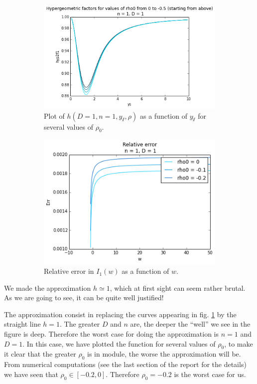 \begin{figure}[htp]
\centering
\begin{subfigure}{.5\textwidth}
	\centering
	\includegraphics[width=.9\linewidth]{img/approx/hyp2f1.png}
	\caption{Plot of $h(D=1,n=1,y_\sslash,\rho)$ as a function of $y_\sslash$ for several values of $\rho_0$.}
	\label{fig:h}
	\end{subfigure}%
\begin{subfigure}{.5\textwidth}
	\centering
	\includegraphics[width=.9\linewidth]{img/approx/relat_err.png}
	\caption{Relative error in $I_1(w)$ as a function of $w$.}
	\label{fig:I1}
\end{subfigure}
\caption{}
\label{fig:approx}
\end{figure}


We made the approximation $h \simeq 1$, which at first sight can seem rather brutal. As we are going to see, it can be quite well justified!

The approximation consist in replacing the curves appearing in fig. \ref{fig:h} by the straight line $h = 1$. The greater $D$ and $n$ are, the deeper the ``well'' we see in the figure is deep. Therefore the worst case for doing the approximation is $n=1$ and $D=1$. In this case, we have plotted the function for several values of $\rho_0$, to make it clear that the greater $\rho_0$ is in module, the worse the approximation will be. From numerical computations (see the last section of the report for the details) we have seen that $\rho_0 \in [-0.2, 0]$. Therefore $\rho_0=-0.2$ is the worst case for us. 


